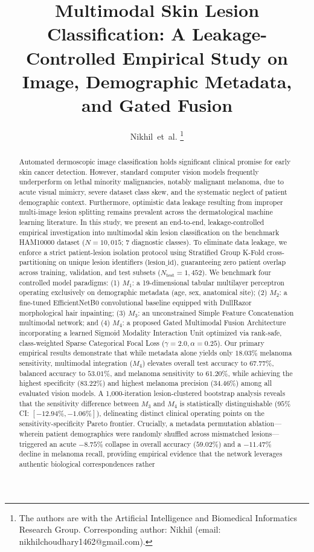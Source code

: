 \documentclass[journal,10pt,twocolumn]{IEEEtran}
\begin{document}
\title{Multimodal Skin Lesion Classification: A Leakage-Controlled Empirical Study on Image, Demographic Metadata, and Gated Fusion}

\author{Nikhil~et~al.
\thanks{The authors are with the Artificial Intelligence and Biomedical Informatics Research Group. Corresponding author: Nikhil (email: nikhilchoudhary1462@gmail.com).}
}

\maketitle

\begin{abstract}
Automated dermoscopic image classification holds significant clinical promise for early skin cancer detection. However, standard computer vision models frequently underperform on lethal minority malignancies, notably malignant melanoma, due to acute visual mimicry, severe dataset class skew, and the systematic neglect of patient demographic context. Furthermore, optimistic data leakage resulting from improper multi-image lesion splitting remains prevalent across the dermatological machine learning literature. In this study, we present an end-to-end, leakage-controlled empirical investigation into multimodal skin lesion classification on the benchmark HAM10000 dataset ($N = 10,015$; 7 diagnostic classes). To eliminate data leakage, we enforce a strict patient-lesion isolation protocol using Stratified Group K-Fold cross-partitioning on unique lesion identifiers ($\text{lesion\_id}$), guaranteeing zero patient overlap across training, validation, and test subsets ($N_{\text{test}} = 1,452$). We benchmark four controlled model paradigms: (1) $M_1$: a 19-dimensional tabular multilayer perceptron operating exclusively on demographic metadata (age, sex, anatomical site); (2) $M_2$: a fine-tuned EfficientNetB0 convolutional baseline equipped with DullRazor morphological hair inpainting; (3) $M_3$: an unconstrained Simple Feature Concatenation multimodal network; and (4) $M_4$: a proposed Gated Multimodal Fusion Architecture incorporating a learned Sigmoid Modality Interaction Unit optimized via rank-safe, class-weighted Sparse Categorical Focal Loss ($\gamma = 2.0, \alpha = 0.25$). Our primary empirical results demonstrate that while metadata alone yields only $18.03\%$ melanoma sensitivity, multimodal integration ($M_4$) elevates overall test accuracy to $67.77\%$, balanced accuracy to $53.01\%$, and melanoma sensitivity to $61.20\%$, while achieving the highest specificity ($83.22\%$) and highest melanoma precision ($34.46\%$) among all evaluated vision models. A 1,000-iteration lesion-clustered bootstrap analysis reveals that the sensitivity difference between $M_3$ and $M_4$ is statistically distinguishable ($95\%$ CI: $[-12.94\%, -1.06\%]$), delineating distinct clinical operating points on the sensitivity-specificity Pareto frontier. Crucially, a metadata permutation ablation—wherein patient demographics were randomly shuffled across mismatched lesions—triggered an acute $-8.75\%$ collapse in overall accuracy ($59.02\%$) and a $-11.47\%$ decline in melanoma recall, providing empirical evidence that the network leverages authentic biological correspondences rather 
\end{abstract}
\end{document}
